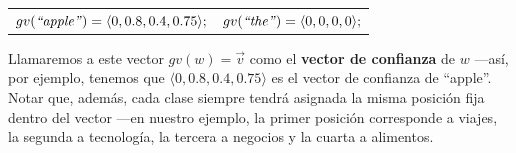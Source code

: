 \vspace{5mm}

\begin{tabular}{l@{\hskip 1in}l}
$gv(\text{\emph{``apple''}}) = \langle 0, 0.8, 0.4, 0.75\rangle;$ & $gv(\text{\emph{``the''}}) = \langle 0, 0, 0, 0\rangle;$
\end{tabular}

\vspace{5mm}

Llamaremos a este vector $gv(w) = \overrightarrow{v}$ como el \textbf{vector de confianza} de $w$ ---así, por ejemplo, tenemos que $\langle 0, 0.8, 0.4, 0.75\rangle$ es el vector de confianza de ``apple''.
Notar que, además, cada clase siempre tendrá asignada la misma posición fija dentro del vector ---en nuestro ejemplo, la primer posición corresponde a viajes, la segunda a tecnología, la tercera a negocios y la cuarta a alimentos.

